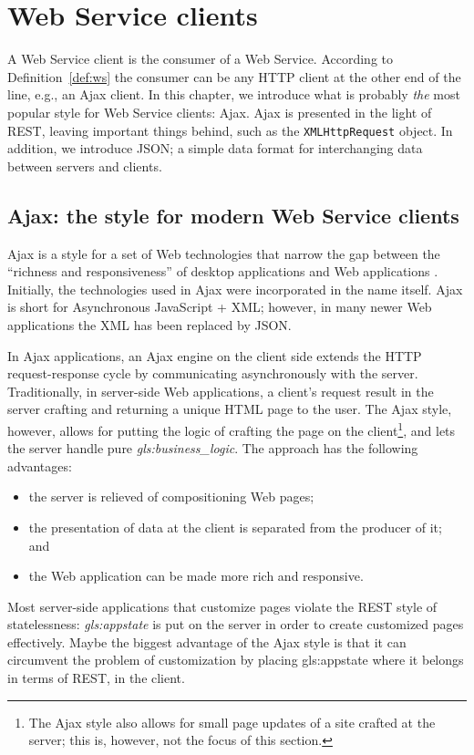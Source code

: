 \chapter{Web Service clients}\label{chap:ws_clients}
A Web Service client is the consumer of a Web Service. According to
Definition~\ref{def:ws} the consumer can be any HTTP client at the other end of
the line, e.g., an Ajax client. In this chapter, we introduce what is probably
\textit{the} most popular style for Web Service clients: Ajax. Ajax is presented
in the light of REST, leaving important things behind, such as the
\verb|XMLHttpRequest| object. In addition, we introduce JSON; a simple data
format for interchanging data between servers and clients.


\section{Ajax: the style for modern Web Service clients}\label{sec:ajax}
Ajax is a style for a set of Web technologies that narrow the gap between the
``richness and responsiveness'' of desktop applications and Web applications
\citep{ajax:coined}. Initially, the technologies used in Ajax were incorporated in
the name itself. Ajax is short for Asynchronous JavaScript + XML; however, in
many newer Web applications the XML has been replaced by JSON.

In Ajax applications, an Ajax engine on the client side extends the HTTP
request-response cycle by communicating asynchronously with the
server. Traditionally, in server-side Web applications, a client's request result
in the server crafting and returning a unique HTML page to the user. The Ajax
style, however, allows for putting the logic of crafting the page on the
client\footnote{The Ajax style also allows for small page updates of a site
crafted at the server; this is, however, not the focus of this section.}, and
lets the server handle pure \textit{\gls{gls:business_logic}}. The approach has
the following advantages:
\begin{itemize}
  \item the server is relieved of compositioning Web pages;
  \item the presentation of data at the client is separated from the producer of
  it; and
  \item the Web application can be made more rich and responsive.
\end{itemize}
Most server-side applications that customize pages violate the REST style of
statelessness: \textit{\gls{gls:appstate}} is put on the server in order to
create customized pages effectively. Maybe the biggest advantage of the Ajax
style is that it can circumvent the problem of customization by placing
\gls{gls:appstate} where it belongs in terms of REST, in the client.

